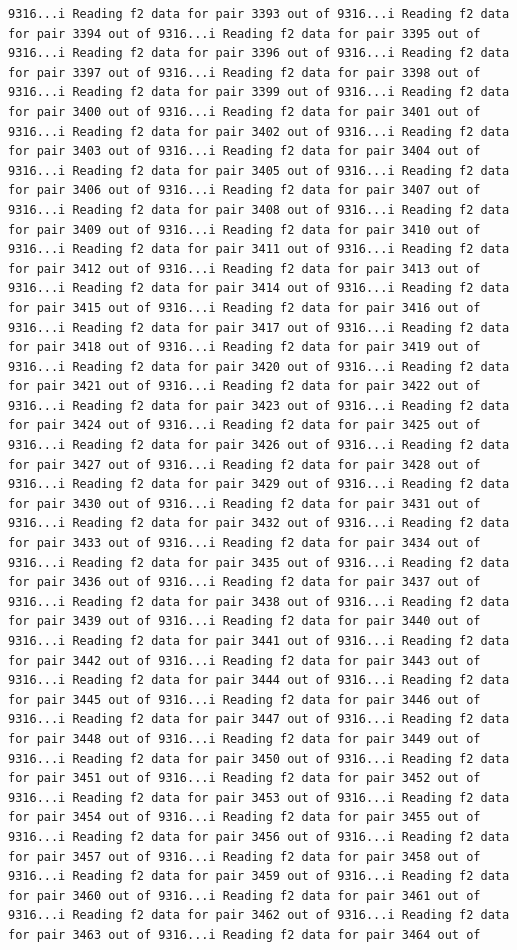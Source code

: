 \documentclass[
]{article}
\begin{document}
\begin{verbatim}
9316...i Reading f2 data for pair 3393 out of 9316...i Reading f2 data for pair 3394 out of 9316...i Reading f2 data for pair 3395 out of 9316...i Reading f2 data for pair 3396 out of 9316...i Reading f2 data for pair 3397 out of 9316...i Reading f2 data for pair 3398 out of 9316...i Reading f2 data for pair 3399 out of 9316...i Reading f2 data for pair 3400 out of 9316...i Reading f2 data for pair 3401 out of 9316...i Reading f2 data for pair 3402 out of 9316...i Reading f2 data for pair 3403 out of 9316...i Reading f2 data for pair 3404 out of 9316...i Reading f2 data for pair 3405 out of 9316...i Reading f2 data for pair 3406 out of 9316...i Reading f2 data for pair 3407 out of 9316...i Reading f2 data for pair 3408 out of 9316...i Reading f2 data for pair 3409 out of 9316...i Reading f2 data for pair 3410 out of 9316...i Reading f2 data for pair 3411 out of 9316...i Reading f2 data for pair 3412 out of 9316...i Reading f2 data for pair 3413 out of 9316...i Reading f2 data for pair 3414 out of 9316...i Reading f2 data for pair 3415 out of 9316...i Reading f2 data for pair 3416 out of 9316...i Reading f2 data for pair 3417 out of 9316...i Reading f2 data for pair 3418 out of 9316...i Reading f2 data for pair 3419 out of 9316...i Reading f2 data for pair 3420 out of 9316...i Reading f2 data for pair 3421 out of 9316...i Reading f2 data for pair 3422 out of 9316...i Reading f2 data for pair 3423 out of 9316...i Reading f2 data for pair 3424 out of 9316...i Reading f2 data for pair 3425 out of 9316...i Reading f2 data for pair 3426 out of 9316...i Reading f2 data for pair 3427 out of 9316...i Reading f2 data for pair 3428 out of 9316...i Reading f2 data for pair 3429 out of 9316...i Reading f2 data for pair 3430 out of 9316...i Reading f2 data for pair 3431 out of 9316...i Reading f2 data for pair 3432 out of 9316...i Reading f2 data for pair 3433 out of 9316...i Reading f2 data for pair 3434 out of 9316...i Reading f2 data for pair 3435 out of 9316...i Reading f2 data for pair 3436 out of 9316...i Reading f2 data for pair 3437 out of 9316...i Reading f2 data for pair 3438 out of 9316...i Reading f2 data for pair 3439 out of 9316...i Reading f2 data for pair 3440 out of 9316...i Reading f2 data for pair 3441 out of 9316...i Reading f2 data for pair 3442 out of 9316...i Reading f2 data for pair 3443 out of 9316...i Reading f2 data for pair 3444 out of 9316...i Reading f2 data for pair 3445 out of 9316...i Reading f2 data for pair 3446 out of 9316...i Reading f2 data for pair 3447 out of 9316...i Reading f2 data for pair 3448 out of 9316...i Reading f2 data for pair 3449 out of 9316...i Reading f2 data for pair 3450 out of 9316...i Reading f2 data for pair 3451 out of 9316...i Reading f2 data for pair 3452 out of 9316...i Reading f2 data for pair 3453 out of 9316...i Reading f2 data for pair 3454 out of 9316...i Reading f2 data for pair 3455 out of 9316...i Reading f2 data for pair 3456 out of 9316...i Reading f2 data for pair 3457 out of 9316...i Reading f2 data for pair 3458 out of 9316...i Reading f2 data for pair 3459 out of 9316...i Reading f2 data for pair 3460 out of 9316...i Reading f2 data for pair 3461 out of 9316...i Reading f2 data for pair 3462 out of 9316...i Reading f2 data for pair 3463 out of 9316...i Reading f2 data for pair 3464 out of 
\end{verbatim}
\end{document}
